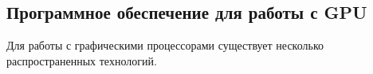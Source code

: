 \begin{figure}[H]
\end{figure} 

\subsection{Программное обеспечение для работы с GPU}
Для работы с графическими процессорами существует несколько распространенных технологий.

